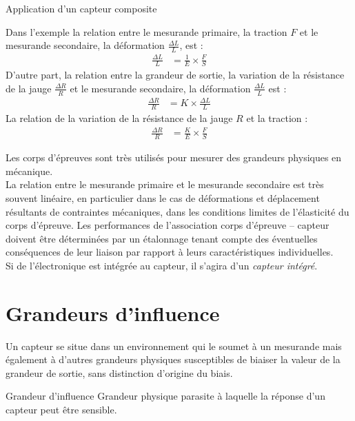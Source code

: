 \begin{exemple}{Application d'un capteur composite}{}
\begin{center}
\begin{tikzpicture}[x=0.75pt,y=0.75pt,yscale=-0.6,xscale=0.6]
\end{tikzpicture}
\end{center}


Dans l'exemple la relation entre le mesurande primaire, la traction $F$ et le mesurande secondaire, la déformation $\frac{\Delta L}{L}$, est :
\begin{align*}
\frac{\Delta L}{L} &= \frac{1}{E} \times \frac{F}{S} 
\end{align*}
D'autre part, la relation entre la grandeur de sortie, la variation de la résistance de la jauge $\frac{\Delta R}{R}$ et le mesurande secondaire, la déformation $\frac{\Delta L}{L}$ est :
\begin{align*}
\frac{\Delta R}{R} &= K \times \frac{\Delta L}{L}
\end{align*}
La relation de la variation de la résistance de la jauge $R$ et la traction :
\begin{align*}
\frac{\Delta R}{R} &= \frac{K}{E} \times \frac{F}{S} 
\end{align*}
\end{exemple}

Les corps d'épreuves sont très utilisés pour mesurer des grandeurs physiques en mécanique.\\
La relation entre le mesurande primaire et le mesurande secondaire est très souvent linéaire, en particulier dans le cas de déformations et déplacement résultants de contraintes mécaniques, dans les conditions limites de l'élasticité du corps d'épreuve. Les performances de l'association corps d'épreuve -- capteur doivent être déterminées par un étalonnage tenant compte des éventuelles conséquences de leur liaison par rapport à leurs caractéristiques individuelles.\\
Si de l'électronique est intégrée au capteur, il s'agira d'un \emph{capteur intégré}.

\section{Grandeurs d'influence}

Un capteur se situe dans un environnement qui le soumet à un mesurande mais également à d'autres grandeurs physiques susceptibles de biaiser la valeur de la grandeur de sortie, sans distinction d'origine du biais.

\begin{definition}{Grandeur d'influence}{}
Grandeur physique \og parasite \fg{} à laquelle la réponse d'un capteur peut être sensible.
\end{definition}

